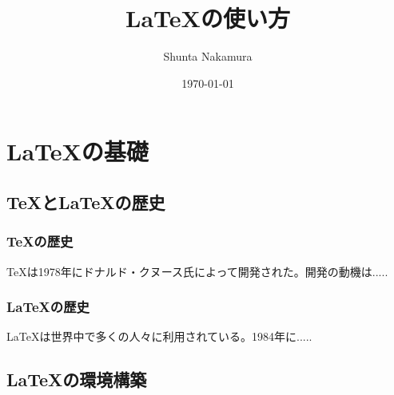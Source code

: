 \documentclass[a4paper, 11pt]{jsarticle}
\title{\LaTeX{}の使い方}
\author{Shunta Nakamura}
\date{\today}
\begin{document}
\maketitle
\tableofcontents
\section{\LaTeX{}の基礎}
    \subsection{\TeX{}と\LaTeX{}の歴史}
        \subsubsection{\TeX{}の歴史}
\TeX{}は1978年にドナルド・クヌース氏によって開発された。開発の動機は.....
        \subsubsection{\LaTeX{}の歴史}
\LaTeX{}は世界中で多くの人々に利用されている。1984年に.....
    \subsection{\LaTeX{}の環境構築}
\end{document}
